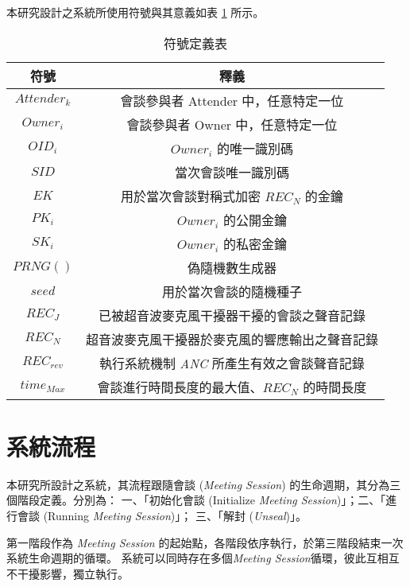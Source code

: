     本研究設計之系統所使用符號與其意義如表 \ref{table:tab.symbol} 所示。

\begin{table}[H]
    \centering
    \caption{符號定義表}
    \label{table:tab.symbol}
    \begin{tabular}{ c c }
        \hline
        \bf{符號} & \bf{釋義} \\
        \hline
        $Attender_{k}$ & 會談參與者 Attender 中，任意特定一位 \\
        $Owner_{i}$    & 會談參與者 Owner 中，任意特定一位 \\
        $OID_{i}$          & $Owner_{i}$ 的唯一識別碼 \\
        $SID$          & 當次會談唯一識別碼 \\
        $EK$           & 用於當次會談對稱式加密 $REC_{N}$ 的金鑰 \\
        $PK_{i}$       & $Owner_{i}$ 的公開金鑰 \\
        $SK_{i}$       & $Owner_{i}$ 的私密金鑰 \\
        $PRNG()$       & 偽隨機數生成器 \\
        $seed$         & 用於當次會談的隨機種子 \\
        $REC_{J}$      & 已被超音波麥克風干擾器干擾的會談之聲音記錄 \\
        $REC_{N}$      & 超音波麥克風干擾器於麥克風的響應輸出之聲音記錄 \\
        $REC_{rev}$    & 執行系統機制 {\it ANC} 所產生有效之會談聲音記錄 \\
        $time_{Max}$   & 會談進行時間長度的最大值、$REC_{N}$ 的時間長度 \\

    \end{tabular}
\end{table}


\section{系統流程}

    本研究所設計之系統，其流程跟隨會談 ({\it Meeting Session}) 的生命週期，其分為三個階段定義。分別為：
一、「初始化會談 (Initialize {\it Meeting Session})」；二、「進行會談 (Running {\it Meeting Session})」；
三、「解封 ({\it Unseal})」。

    第一階段作為 {\it Meeting Session} 的起始點，各階段依序執行，於第三階段結束一次系統生命週期的循環。
系統可以同時存在多個{\it Meeting Session}循環，彼此互相互不干擾影響，獨立執行。

